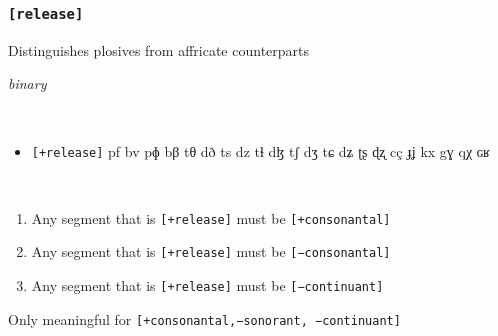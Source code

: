 \documentclass[10pt,letterpaper]{article}
\begin{document}
\subsubsection{\texttt{[release]}}
\label{ssub:feature_release}
\begin{samepage}
\begin{description}
\itemsep1pt \parskip0pt  
\item[Descritpion] Distinguishes plosives from affricate counterparts
\item[Type] \emph{binary}
\item[Examples]\
  \begin{itemize}
    \item \texttt{[+release]}
    pf bv pɸ bβ tθ dð ts dz tɬ dɮ tʃ dʒ tɕ dʑ ʈʂ ɖʐ cç ɟʝ kx gɣ qχ ɢʁ
  \end{itemize}
\item[Constraints]\
  \begin{enumerate}
  \itemsep1pt \parskip0pt  
    \item Any segment that is \texttt{[+release]} must be \texttt{[+consonantal]}
    \item Any segment that is \texttt{[+release]} must be \texttt{[−consonantal]}
    \item Any segment that is \texttt{[+release]} must be \texttt{[−continuant]}
  \end{enumerate}
\item[Resctrictions] Only meaningful for \texttt{[+consonantal,−sonorant, −continuant]}
\end{description}
\end{samepage}
\end{document}
